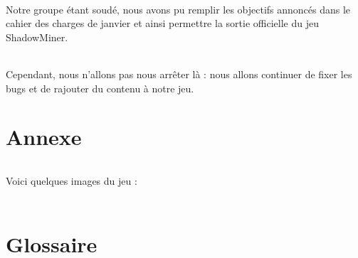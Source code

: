 \documentclass[titlepage, 13px, a4paper]{report}
\begin{document}
\paragraph*{} \hspace{0pt}
Notre groupe étant soudé, nous avons pu remplir les objectifs annoncés dans le cahier des 
charges de janvier et ainsi permettre la sortie officielle du jeu ShadowMiner. \\

\paragraph*{} \hspace{0pt}
Cependant, nous n’allons pas nous arrêter là : nous allons continuer de fixer les bugs 
et de rajouter du contenu à notre jeu. \\



\newpage

\newpage


\part{Annexe}
\paragraph*{} \hspace{0pt}
Voici quelques images du jeu : \\ \\




\part{Glossaire}
\end{document}
